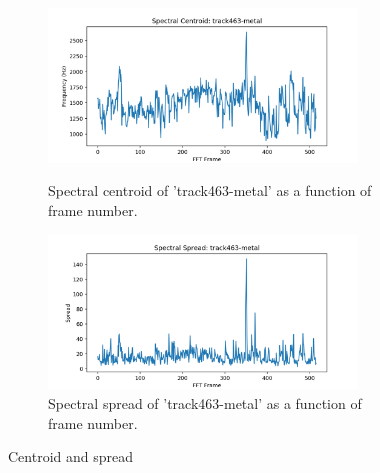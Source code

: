 \documentclass[11pt,a4paper]{article}
\begin{document}
\begin{figure}[tb]\ContinuedFloat
	\begin{subfigure}[t]{\hsize}
		\centering
		\includegraphics[width=0.9\textwidth]{centroid_track463-metal}
		\label{fig:centroid_metal}
		\caption{Spectral centroid of 'track463-metal' as a function of frame number.}
	\end{subfigure}
	\begin{subfigure}[t]{\hsize}
		\centering
		\includegraphics[width=0.9\textwidth]{spread_track463-metal}
		\caption{Spectral spread of 'track463-metal' as a function of frame number.}
		\label{fig:spread_metal}
	\end{subfigure}
	\caption{Centroid and spread}
\end{figure}
\clearpage
\end{document}
